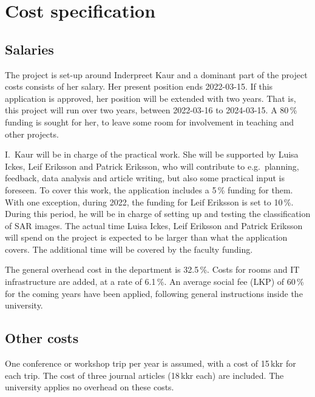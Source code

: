 \documentclass[12pt,oneside,a4paper]{article}
\begin{document}
\thispagestyle{empty}


\section*{Cost specification}

\subsection*{Salaries}
%
The project is set-up around Inderpreet Kaur and a dominant part of the
project costs consists of her salary. Her present position ends 2022-03-15. If
this application is approved, her position will be extended with two years.
That is, this project will run over two years, between 2022-03-16 to
2024-03-15. A 80\,\% funding is sought for her, to leave some room for involvement in 
teaching and other projects.

I.\ Kaur will be in charge of the practical work. She will be supported by
Luisa Ickes, Leif Eriksson and Patrick Eriksson, who will contribute to e.g.\
planning, feedback, data analysis and article writing, but also some practical
input is foreseen. To cover this work, the application includes a 5\,\% funding
for them. With one exception, during 2022, the funding for Leif Eriksson is set
to 10\,\%. During this period, he will be in charge of setting up and testing the
classification of SAR images. The actual time Luisa Ickes, Leif Eriksson and
Patrick Eriksson will spend on the project is expected to be larger than what
the application covers. The additional time will be covered by the faculty
funding.

The general overhead cost in the department is 32.5\,\%. Costs for rooms and IT
infrastructure are added, at a rate of 6.1\,\%. An average social fee (LKP) of
60\,\% for the coming years have been applied, following general instructions
inside the university.



\subsection*{Other costs}
%
One conference or workshop trip per year is assumed, with a cost of 15\,kkr for
each trip. The cost of three journal articles (18\,kkr each) are included. The
university applies no overhead on these costs.
\end{document}

